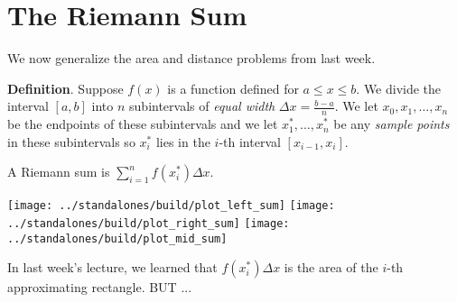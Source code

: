 \documentclass[../main.tex]{subfiles}
\begin{document}

\section{The Riemann Sum}
We now generalize the area and distance problems from last week.

\textbf{Definition}. Suppose \(f(x)\) is a function defined for \(a \le x \le b\). We divide the interval \([a,b]\) into \(n\) subintervals of \emph{equal width} \(\Delta{x} = \frac{b-a}{n}\). We let \(x_{0}, x_{1}, \dots, x_{n}\) be the endpoints of these subintervals and we let \(x_{1}^{*}, \dots, x_{n}^{*}\) be any \emph{sample points} in these subintervals so \(x_{i}^{*}\) lies in the \(i\)-th interval \([x_{i-1}, x_{i}]\). 


\vspace{3cm}

\begin{mdframed}[style=simple]
  A Riemann sum is {\(\sum_{i=1}^{n} f(x_{i}^{*}) \Delta x\).}

\end{mdframed}

\bigskip

\begin{center}
  \texttt{[image: ../standalones/build/plot\_left\_sum]}
  \texttt{[image: ../standalones/build/plot\_right\_sum]}
  \texttt{[image: ../standalones/build/plot\_mid\_sum]}
\end{center}
\vspace{2cm}

\faExclamationTriangle{} In last week's lecture, we learned that \(f(x_{i}^{*}) \Delta x\) is the area of the \(i\)-th approximating rectangle. BUT ...

\clearpage
\end{document}
